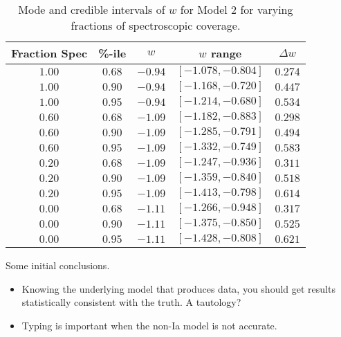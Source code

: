 \documentclass[preprint]{aastex}
\begin{document}
\begin{table}
\centering
\begin{tabular}{|c|c|ccc|}
\hline
Fraction Spec&\%-ile &$w$ & $w$ range & $\Delta w$\\ \hline
$1.00$ &$0.68$ &$-0.94$ & $[-1.078, -0.804]$ & $0.274$ \\
$1.00$ &$0.90$ &$-0.94$ & $[-1.168, -0.720]$ & $0.447$ \\
$1.00$ &$0.95$ &$-0.94$ & $[-1.214, -0.680]$ & $0.534$ \\
$0.60$ &$0.68$ &$-1.09$ & $[-1.182, -0.883]$ & $0.298$ \\
$0.60$ &$0.90$ &$-1.09$ & $[-1.285, -0.791]$ & $0.494$ \\
$0.60$ &$0.95$ &$-1.09$ & $[-1.332, -0.749]$ & $0.583$ \\
$0.20$ &$0.68$ &$-1.09$ & $[-1.247, -0.936]$ & $0.311$ \\
$0.20$ &$0.90$ &$-1.09$ & $[-1.359, -0.840]$ & $0.518$ \\
$0.20$ &$0.95$ &$-1.09$ & $[-1.413, -0.798]$ & $0.614$ \\
$0.00$ &$0.68$ &$-1.11$ & $[-1.266, -0.948]$ & $0.317$ \\
$0.00$ &$0.90$ &$-1.11$ & $[-1.375, -0.850]$ & $0.525$ \\
$0.00$ &$0.95$ &$-1.11$ & $[-1.428, -0.808]$ & $0.621$ \\
\hline
\end{tabular}
\caption{Mode and credible intervals of $w$ for Model 2  for varying
fractions of spectroscopic coverage.\label{seed2_pop2:tab}}
\end{table}

Some initial conclusions.
\begin{itemize}
\item Knowing the underlying model that produces data, you should
get results statistically consistent with the truth.  A tautology?
\item Typing is important when the non-Ia model is not accurate.
\end{itemize}
\end{document}
